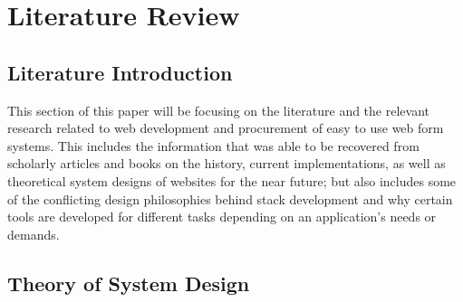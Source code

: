 \chapter{Literature Review}

\section{Literature Introduction}

This section of this paper will be focusing on the literature and the relevant research related to web development and procurement of easy to use web form systems. This includes the information that was able to be recovered from scholarly articles and books on the history, current implementations, as well as theoretical system designs of websites for the near future; but also includes some of the conflicting design philosophies behind stack development and why certain tools are developed for different tasks depending on an application's needs or demands.

\section{Theory of System Design}

